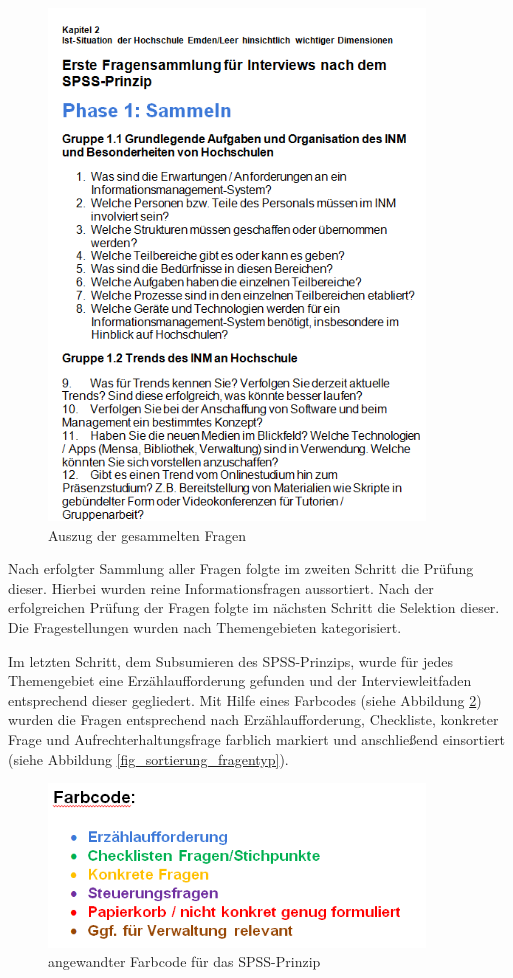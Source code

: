 \begin{figure}[h!]
	\centering
	\includegraphics[width=10cm]{kapitel/gruppe2/bilder/auszug_fragen}
	\caption{Auszug der gesammelten Fragen}
	\label{fig_auszug_fragen_sammeln}
\end{figure}
Nach erfolgter Sammlung aller Fragen folgte im zweiten Schritt die Prüfung dieser. Hierbei wurden reine Informationsfragen aussortiert. Nach der erfolgreichen Prüfung der Fragen folgte im nächsten Schritt die Selektion dieser. Die Fragestellungen wurden nach Themengebieten kategorisiert. 

Im letzten Schritt, dem Subsumieren des SPSS-Prinzips, wurde für jedes Themengebiet eine Erzählaufforderung gefunden und der Interviewleitfaden entsprechend dieser gegliedert. Mit Hilfe eines Farbcodes (siehe Abbildung \ref{fig_farbcode_SPSS}) wurden die Fragen entsprechend nach Erzählaufforderung, Checkliste, konkreter Frage und Aufrechterhaltungsfrage farblich markiert und anschließend einsortiert (siehe Abbildung \ref{fig_sortierung_fragentyp}).

\begin{figure}[h!]
	\centering
	\includegraphics[width=10cm]{kapitel/gruppe2/bilder/farbcode_spss}
	\caption{angewandter Farbcode für das SPSS-Prinzip}
	\label{fig_farbcode_SPSS}
\end{figure}

